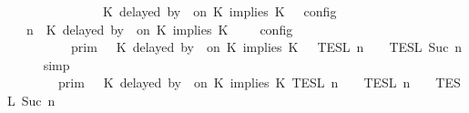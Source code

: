 \begin{isabellebody}
\ \ \ \ \ \ \ \ \ \ \ \ {\isasymturnstile}\ {\isasymPsi}\ {\isasymtriangleright}\ {\isacharparenleft}{\isacharparenleft}K\ delayed\ by\ {}\ on\ K\ implies\ K\ {\isacharhash}\ {\isasymPhi}{\isacharparenright}\ {\isasymrbrakk}\isactrlsub c\isactrlsub o\isactrlsub n\isactrlsub f\isactrlsub i\isactrlsub g\isanewline
\ \ {\isacartoucheclose}\isanewline
%
\isadelimproof
%
\endisadelimproof
%
\isatagproof
{}\isamarkupfalse%
\ {\isacharminus}\isanewline
\ \ \isamarkupfalse%
\ {\isacartoucheopen}{\isasymlbrakk}\ {\isasymGamma}{\isacharcomma}\ n\ {\isasymturnstile}\ {\isacharparenleft}{\isacharparenleft}K\ delayed\ by\ {}\ on\ K\ implies\ K\ {\isacharhash}\ {\isasymPsi}{\isacharparenright}\ {\isasymtriangleright}\ {\isasymPhi}\ {\isasymrbrakk}\isactrlsub c\isactrlsub o\isactrlsub n\isactrlsub f\isactrlsub i\isactrlsub g\ {\isacharequal}\isanewline
\ \ \ \ \ \ \ \ {\isasymlbrakk}{\isasymlbrakk}\ {\isasymGamma}\ {\isasymrbrakk}{\isasymrbrakk}\isactrlsub p\isactrlsub r\isactrlsub i\isactrlsub m\ {\isasyminter}\ {\isasymlbrakk}{\isasymlbrakk}\ {\isacharparenleft}K\ delayed\ by\ {}\ on\ K\ implies\ K\ {\isacharhash}\ {\isasymPsi}\ {\isasymrbrakk}{\isasymrbrakk}\isactrlsub T\isactrlsub E\isactrlsub S\isactrlsub L\isactrlbsup {\isasymge}\ n\isactrlesup \ {\isasyminter}\ {\isasymlbrakk}{\isasymlbrakk}\ {\isasymPhi}\ {\isasymrbrakk}{\isasymrbrakk}\isactrlsub T\isactrlsub E\isactrlsub S\isactrlsub L\isactrlbsup {\isasymge}\ Suc\ n\isactrlesup {\isacartoucheclose}\isanewline
\ \ \ \ \isamarkupfalse%
\ simp\isanewline
\ \ \isamarkupfalse%
\ \isamarkupfalse%
\ \isanewline
\ \ \ \ {\isacartoucheopen}{\isachardot}{\isachardot}{\isachardot}\ {\isacharequal}\ {\isasymlbrakk}{\isasymlbrakk}\ {\isasymGamma}\ {\isasymrbrakk}{\isasymrbrakk}\isactrlsub p\isactrlsub r\isactrlsub i\isactrlsub m\ {\isasyminter}\ {\isasymlbrakk}\ K\ delayed\ by\ {}\ on\ K\ implies\ K\ {\isasymrbrakk}\isactrlsub T\isactrlsub E\isactrlsub S\isactrlsub L\isactrlbsup {\isasymge}\ n\isactrlesup \ {\isasyminter}\ {\isasymlbrakk}{\isasymlbrakk}\ {\isasymPsi}\ {\isasymrbrakk}{\isasymrbrakk}\isactrlsub T\isactrlsub E\isactrlsub S\isactrlsub L\isactrlbsup {\isasymge}\ n\isactrlesup \ {\isasyminter}\ {\isasymlbrakk}{\isasymlbrakk}\ {\isasymPhi}\ {\isasymrbrakk}{\isasymrbrakk}\isactrlsub T\isactrlsub E\isactrlsub S\isactrlsub L\isactrlbsup {\isasymge}\ Suc\ n\isactrlesup {\isacartoucheclose}\isanewline

\end{isabellebody}
